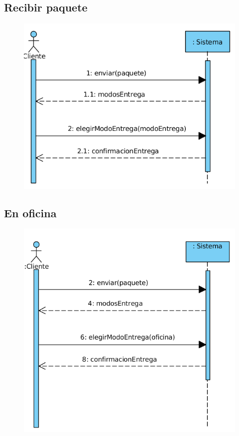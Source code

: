 \subsection{Recibir paquete}
\begin{figure}[H]
	\centering
	\includegraphics[width=16cm]{47}
\end{figure}
\subsection{En oficina}
\begin{figure}[H]
	\centering
	\includegraphics[width=16cm]{48}
\end{figure}

